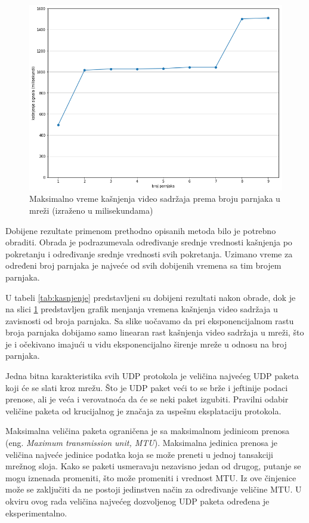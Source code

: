\documentclass[12pt,oneside]{memoir}
\begin{document}
\begin{figure}[!ht]
  \centering
  \includegraphics[width=0.83 \textwidth]{slike/delay_time.png}
  \caption{Maksimalno vreme kašnjenja video sadržaja prema broju parnjaka u mreži (izraženo u milisekundama)}
  \label{fig:kasnjenje}
\end{figure}
\par

Dobijene rezultate primenom prethodno opisanih metoda bilo je potrebno obraditi. Obrada je podrazumevala određivanje srednje vrednosti kašnjenja po pokretanju i određivanje srednje vrednosti svih pokretanja. Uzimano vreme za određeni broj parnjaka je najveće od svih dobijenih vremena sa tim brojem parnjaka. 

U tabeli \ref{tab:kasnjenje} predstavljeni su dobijeni rezultati nakon obrade, dok je na slici \ref{fig:kasnjenje} predstavljen grafik menjanja vremena kašnjenja video sadržaja u zavisnosti od broja parnjaka. Sa slike uočavamo da pri eksponencijalnom rastu broja parnjaka dobijamo samo linearan rast kašnjenja video sadržaja u mreži, što je i očekivano imajući u vidu  eksponencijalno širenje mreže u odnosu na broj parnjaka. 

Jedna bitna karakteristika svih UDP protokola je veličina najvećeg UDP paketa koji će se slati kroz mrežu. Što je UDP paket veći to se brže i jeftinije podaci prenose, ali je veća i verovatnoća da će se neki paket izgubiti. Pravilni odabir veličine paketa od krucijalnog je značaja za uspešnu eksplataciju protokola. 

Maksimalna veličina paketa ograničena je sa maksimalnom jedinicom prenosa (eng. \textit{Maximum transmission unit, MTU}). Maksimalna jedinica prenosa je veličina najveće jedinice podatka koja se može preneti u jednoj tansakciji mrežnog sloja. Kako se paketi usmeravaju nezavisno jedan od drugog, putanje se mogu iznenada promeniti, što može promeniti i vrednost MTU. Iz ove činjenice može se zaključiti da ne postoji jedinstven način za određivanje veličine MTU. U okviru ovog rada veličina najvećeg dozvoljenog UDP paketa određena je eksperimentalno.
\end{document}
